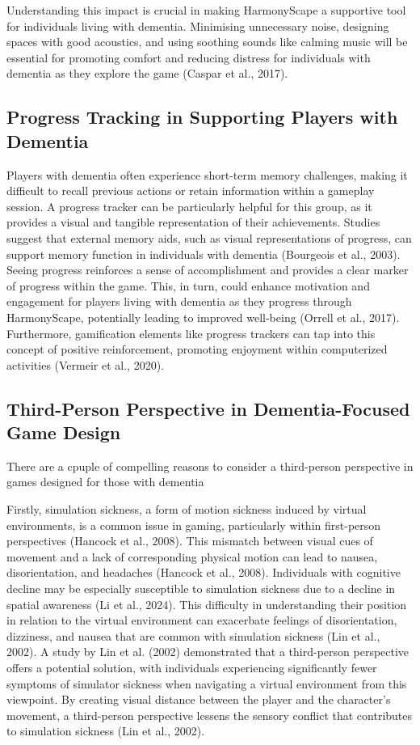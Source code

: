 \documentclass{l4proj}
\begin{document}
Understanding this impact is crucial in making HarmonyScape a supportive tool for individuals living with dementia. Minimising unnecessary noise, designing spaces with good acoustics, and using soothing sounds like calming music will be essential for promoting comfort and reducing distress for individuals with dementia as they explore the game (Caspar et al., 2017).

\subsection{Progress Tracking in Supporting Players with Dementia}\label{sec:progress_tracking}
Players with dementia often experience short-term memory challenges, making it difficult to recall previous actions or retain  information within a gameplay session. A progress tracker can be particularly helpful for this group, as it provides a visual and tangible representation of their achievements. Studies suggest that external memory aids, such as visual representations of progress, can support memory function in individuals with dementia (Bourgeois et al., 2003). Seeing progress reinforces a sense of accomplishment and  provides a clear marker of progress within the game. This, in turn, could enhance motivation and engagement for players living with dementia as they progress through HarmonyScape, potentially leading to improved well-being (Orrell et al., 2017). Furthermore, gamification elements like progress trackers can tap into this concept of positive reinforcement, promoting enjoyment within computerized activities (Vermeir et al., 2020).

\subsection{Third-Person Perspective in Dementia-Focused Game Design}\label{sec:third_person}
There are a cpuple of compelling reasons to consider a third-person perspective in games designed for those with dementia

Firstly, simulation sickness, a form of motion sickness induced by virtual environments, is a common issue in gaming, particularly within first-person perspectives (Hancock et al., 2008). This mismatch between visual cues of movement and a lack of corresponding physical motion can lead to nausea, disorientation, and headaches (Hancock et al., 2008). Individuals with cognitive decline may be especially susceptible to simulation sickness due to a decline in spatial awareness (Li et al., 2024). This difficulty in understanding their position in relation to the virtual environment can exacerbate feelings of disorientation, dizziness, and nausea that are common with simulation sickness (Lin et al., 2002). A study by Lin et al. (2002) demonstrated that a third-person perspective offers a potential solution, with individuals experiencing significantly fewer symptoms of simulator sickness when navigating a virtual environment from this viewpoint. By creating visual distance between the player and the character's movement, a third-person perspective lessens the sensory conflict that contributes to simulation sickness (Lin et al., 2002).
\end{document}

